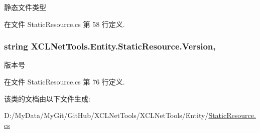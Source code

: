 静态文件类型 



在文件 Static\-Resource.\-cs 第 58 行定义.

\hypertarget{class_x_c_l_net_tools_1_1_entity_1_1_static_resource_a4b85a7d2f6dc6169a10ebfe2987f2404}{
\subsubsection[{Version}]{\setlength{\rightskip}{0pt plus 5cm}string X\-C\-L\-Net\-Tools.\-Entity.\-Static\-Resource.\-Version\hspace{0.3cm}{\ttfamily [get]}, {\ttfamily [set]}}}\label{class_x_c_l_net_tools_1_1_entity_1_1_static_resource_a4b85a7d2f6dc6169a10ebfe2987f2404}


版本号 



在文件 Static\-Resource.\-cs 第 76 行定义.



该类的文档由以下文件生成\-:\begin{DoxyCompactItemize}
\item 
D\-:/\-My\-Data/\-My\-Git/\-Git\-Hub/\-X\-C\-L\-Net\-Tools/\-X\-C\-L\-Net\-Tools/\-Entity/\hyperlink{_static_resource_8cs}{Static\-Resource.\-cs}\end{DoxyCompactItemize}
